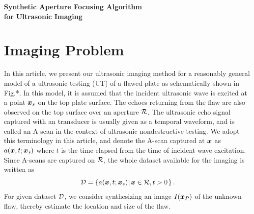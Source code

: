 ﻿\documentclass[11pt,a4j]{article}
\newlength{\minitwocolumn}
\begin{document}
\newcommand{\fat}[1]{\mbox{\boldmath $#1$}}
\newcommand{\D}{\partial}
\newcommand{\w}{\omega}
\newcommand{\ga}{\alpha}
\newcommand{\gb}{\beta}
\newcommand{\gx}{\xi}
\newcommand{\gz}{\zeta}
\newcommand{\vhat}[1]{\hat{\fat{#1}}}
\newcommand{\spc}{\vspace{0.7\baselineskip}}
\newcommand{\halfspc}{\vspace{0.3\baselineskip}}

\newcommand{\twofig}[2]
 {
   \begin{figure}[h]
     \begin{minipage}[t]{\minitwocolumn}
         \begin{center}   #1
         \end{center}
     \end{minipage}
         \hspace{\columnsep}
     \begin{minipage}[t]{\minitwocolumn}
         \begin{center} #2
         \end{center}
     \end{minipage}
   \end{figure}
 }
\begin{center}
{\LARGE \bf Synthetic Aperture Focusing Algorithm \\ for Ultrasonic Imaging}
\end{center}
\vspace{10mm}
\section{Imaging Problem}
\hspace{\parindent}
In this article, we present our ultrasonic imaging method 
for a reasonably general model of a ultrasonic testing (UT) 
of a flawed plate as schematically shown in Fig.*. 
In this model, it is assumed that the incident ultrasonic wave is 
excited at a point $\fat{x}_s$ on the top plate surface.
The echoes returning from the flaw are also observed on the top surface 
over an aperture $\cal R$.
The ultrasonic echo signal captured with an transducer is usually given as a temporal 
 waveform, and is called an A-scan in the context of ultrasonic nondestructive testing.
We adopt this terminology in this article, and denote the A-scan captured 
at $\fat{x}$ as $a(\fat{x},t;\fat{x}_s)$ where $t$ is the time elapsed from 
the time of incident wave excitation. 
Since A-scans are captured on $\cal R$, the whole dataset 
 available for the imaging is written as 
\begin{equation}
	{\cal D} = \left\{
		a(\fat{x},t;\fat{x}_s)\left| \fat{x}\in {\cal R},t>0 \right.
	\right\}.
	\label{eqn:bscan_data}
\end{equation}
For given dataset $\cal D$, we consider synthesizing an image $I(\fat{x}_P)$ 
of the unknown flaw, thereby estimate the location and size of the flaw.
\end{document}
